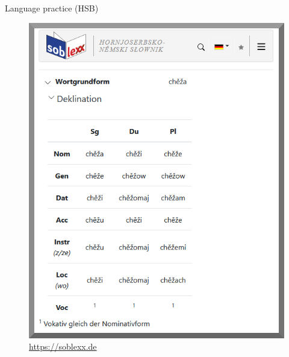 \begin{block}{Language practice (HSB)}
    \begin{figure}
        \centering
        \includegraphics[width=0.6\colwidth]{05_z_02_soblex_klein_rand.png}
        \caption{\url{https://soblexx.de}}
        \label{fig:soblex}
    \end{figure}

    
  \end{block}
